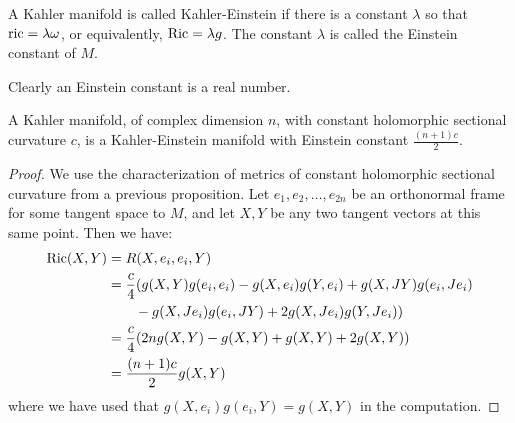 \begin{definition} A Kahler manifold is called Kahler-Einstein if there is a constant $\lambda$ so that $\text{ric} = \lambda \omega$, or equivalently, $\text{Ric} = \lambda g$.  The constant $\lambda $ is called the Einstein constant of $M$.
\end{definition}

Clearly an Einstein constant is a real number.

\begin{prop} A Kahler manifold, of complex dimension $n$, with constant holomorphic sectional curvature $c$, is a Kahler-Einstein manifold with Einstein constant $\frac{(n+1)c}{2}$.
\end{prop}

\begin{proof}
%
We use the characterization of metrics of constant holomorphic sectional curvature from a previous proposition.  Let $e_1, e_2, \ldots, e_{2n}$ be an orthonormal frame for some tangent space to $M$, and let $X, Y$ be any two tangent vectors at this same point.  Then we have:
%
\begin{align*}
\text{Ric}(X,Y) &= R(X, e_i, e_i, Y) \\
&= \frac{c}{4} ( g(X,Y)g(e_i,e_i) - g(X,e_i)g(Y,e_i) + g(X, JY)g(e_i, Je_i) \\
& \qquad - g(X,Je_i)g(e_i,JY) + 2g(X,Je_i)g(Y,Je_i) ) \\
&= \frac{c}{4}( 2n g(X,Y) - g(X,Y) + g(X,Y) + 2g(X,Y) ) \\
&= \frac{ (n+1) c }{2} g(X,Y)
\end{align*}
%
where we have used that $g(X,e_i)g(e_i,Y) = g(X,Y)$ in the computation.
%
\end{proof}
